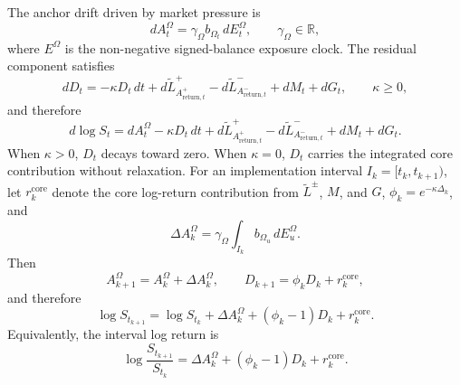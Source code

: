 \documentclass[11pt]{article}
\begin{document}
    The anchor drift driven by market pressure is
    \[
        dA_t^\Omega
        =
        \gamma_\Omega b_{\Omega_t}\,dE_t^\Omega,
        \qquad
        \gamma_\Omega\in\mathbb R,
    \]
    where \(E^\Omega\) is the non-negative signed-balance exposure clock.
    The residual component satisfies
    \[
        dD_t
        =
        -\kappa D_t\,dt
        +d\widetilde L^+_{A_{\mathrm{return},t}^+}
        -d\widetilde L^-_{A_{\mathrm{return},t}^-}
        +dM_t
        +dG_t,
        \qquad
        \kappa\ge0,
    \]
    and therefore
    \[
        d\log S_t
        =
        dA_t^\Omega
        -\kappa D_t\,dt
        +d\widetilde L^+_{A_{\mathrm{return},t}^+}
        -d\widetilde L^-_{A_{\mathrm{return},t}^-}
        +dM_t
        +dG_t.
    \]
    When \(\kappa>0\), \(D_t\) decays toward zero.
    When \(\kappa=0\), \(D_t\) carries the integrated core contribution without
    relaxation.
    For an implementation interval \(I_k=[t_k,t_{k+1})\), let
    \(r_k^{\mathrm{core}}\) denote the core log-return contribution from
    \(\widetilde L^\pm\), \(M\), and \(G\),
    \(\phi_k=e^{-\kappa\Delta_k}\), and
    \[
        \Delta A_k^\Omega
        =
        \gamma_\Omega
        \int_{I_k} b_{\Omega_u}\,dE_u^\Omega.
    \]
    Then
    \[
        A_{k+1}^\Omega=A_k^\Omega+\Delta A_k^\Omega,
        \qquad
        D_{k+1}=\phi_k D_k+r_k^{\mathrm{core}},
    \]
    and therefore
    \[
        \log S_{t_{k+1}}
        =
        \log S_{t_k}
        +\Delta A_k^\Omega+(\phi_k-1)D_k+r_k^{\mathrm{core}}.
    \]
    Equivalently, the interval log return is
    \[
        \log\frac{S_{t_{k+1}}}{S_{t_k}}
        =
        \Delta A_k^\Omega+(\phi_k-1)D_k+r_k^{\mathrm{core}}.
    \]
\end{document}
